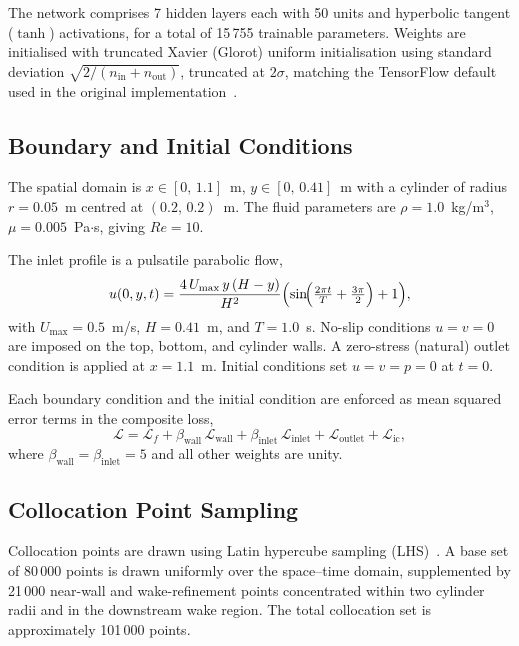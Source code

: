 The network comprises 7 hidden layers each with 50 units and hyperbolic
tangent ($\tanh$) activations, for a total of 15\,755 trainable parameters.  Weights are initialised
with truncated Xavier (Glorot) uniform initialisation using standard
deviation $\sqrt{2/(n_\text{in}+n_\text{out})}$, truncated at $2\sigma$,
matching the TensorFlow default used in the original
implementation~\cite{rao2020pinnflow}.

\subsection{Boundary and Initial Conditions}

The spatial domain is $x\in[0,\,1.1]$~m, $y\in[0,\,0.41]$~m with a
cylinder of radius $r=0.05$~m centred at $(0.2,\,0.2)$~m.  The fluid
parameters are $\rho=1.0$~kg/m$^3$, $\mu=0.005$~Pa$\cdot$s, giving
$Re=10$.

The inlet profile is a pulsatile parabolic flow,
\begin{equation}
  u(0,y,t) = \frac{4\,U_{\max}\,y\,(H-y)}{H^2}
              \Bigl(\sin\!\Bigl(\tfrac{2\pi t}{T}+\tfrac{3\pi}{2}\Bigr)+1\Bigr),
  \label{eq:inlet}
\end{equation}
with $U_{\max}=0.5$~m/s, $H=0.41$~m, and $T=1.0$~s.  No-slip
conditions $u=v=0$ are imposed on the top, bottom, and cylinder walls.
A zero-stress (natural) outlet condition is applied at $x=1.1$~m.
Initial conditions set $u=v=p=0$ at $t=0$.

Each boundary condition and the initial condition are enforced as mean
squared error terms in the composite loss,
\begin{equation}
  \mathcal{L} = \mathcal{L}_f
    + \beta_\text{wall}\,\mathcal{L}_\text{wall}
    + \beta_\text{inlet}\,\mathcal{L}_\text{inlet}
    + \mathcal{L}_\text{outlet}
    + \mathcal{L}_\text{ic},
  \label{eq:loss}
\end{equation}
where $\beta_\text{wall}=\beta_\text{inlet}=5$ and all other weights
are unity.

\subsection{Collocation Point Sampling}

Collocation points are drawn using Latin hypercube sampling
(LHS)~\cite{rao2020pinnflow}.  A base set of 80\,000 points is drawn
uniformly over the space--time domain, supplemented by 21\,000
near-wall and wake-refinement points concentrated within two cylinder
radii and in the downstream wake region.  The total collocation set is
approximately 101\,000 points.

